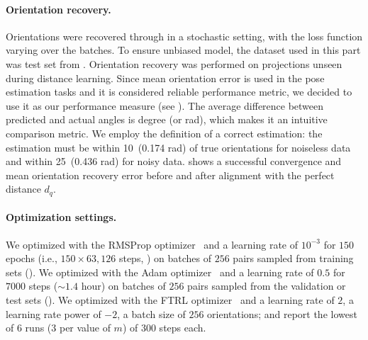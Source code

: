 \paragraph{Orientation recovery.}
Orientations were recovered through  in a stochastic setting, with the loss function varying over the batches.
To ensure unbiased model, the dataset used in this part was test set from .
Orientation recovery was performed on projections unseen during distance learning.
Since mean orientation error is used in the pose estimation tasks and it is considered reliable performance metric, we decided to use it as our performance measure (see ). The average difference between predicted and actual angles is degree (or rad), which makes it an intuitive comparison metric.
We employ the definition of a correct estimation: the estimation must be within 10\degree~(0.174 rad) of true orientations for noiseless data and within 25\degree~(0.436 rad) for noisy data.
 shows a successful convergence and mean orientation recovery error before and after alignment with the perfect distance $d_q$.

\paragraph{Optimization settings.}

We optimized  with the RMSProp optimizer~\cite{tieleman2012rmsprop} and a learning rate of $10^{-3}$ for $150$ epochs (i.e., $150 \times 63,126$ steps,  ) on batches of $256$ pairs sampled from training sets ().
We optimized  with the Adam optimizer~\cite{kingma2014adam} and a learning rate of $0.5$ for $7000$ steps ($\sim 1.4$ hour) on batches of $256$ pairs sampled from the validation or test sets ().
We optimized  with the FTRL optimizer~\cite{mcmahan2013ftrl} and a learning rate of $2$, a learning rate power of $-2$, a batch size of $256$ orientations; and report the lowest of 6 runs (3 per value of $m$) of 300 steps each.

